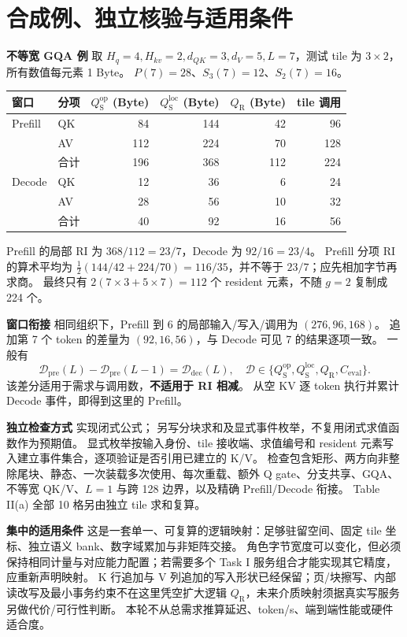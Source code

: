\documentclass[11pt,a4paper,fontset=fandol]{ctexart}
\newcommand{\op}{\mathrm{op}}
\newcommand{\loc}{\mathrm{loc}}
\newcommand{\qs}{Q_{\mathrm S}}
\newcommand{\qr}{Q_{\mathrm R}}
\newcommand{\para}[1]{\par\smallskip\noindent\textbf{#1}\quad}
\begin{document}
\clearpage
\section{合成例、独立核验与适用条件}
\para{不等宽 GQA 例}
取 $H_q=4,H_{kv}=2,d_{QK}=3,d_V=5,L=7$，测试 tile 为 $3\times2$，所有数值每元素 1 Byte。
$P(7)=28$、$S_3(7)=12$、$S_2(7)=16$。
\begin{center}\small
\begin{tabular}{@{}llrrrr@{}}\toprule
窗口 & 分项 & $\qs^\op$ (Byte) & $\qs^\loc$ (Byte) & $\qr$ (Byte) & tile 调用\\\midrule
Prefill & QK & 84 & 144 & 42 & 96\\
 & AV & 112 & 224 & 70 & 128\\
 & 合计 & 196 & 368 & 112 & 224\\\midrule
Decode & QK & 12 & 36 & 6 & 24\\
 & AV & 28 & 56 & 10 & 32\\
 & 合计 & 40 & 92 & 16 & 56\\\bottomrule
\end{tabular}\end{center}
Prefill 的局部 RI 为 $368/112=23/7$，Decode 为 $92/16=23/4$。
Prefill 分项 RI 的算术平均为 $\tfrac12(144/42+224/70)=116/35$，并不等于 $23/7$；应先相加字节再求商。
最终只有 $2(7\times3+5\times7)=112$ 个 resident 元素，不随 $g=2$ 复制成 224 个。

\para{窗口衔接}
相同组织下，Prefill 到 6 的局部输入/写入/调用为 $(276,96,168)$。
追加第 7 个 token 的差量为 $(92,16,56)$，与 Decode 可见 7 的结果逐项一致。
一般有
\begin{equation}
\mathcal D_{\mathrm{pre}}(L)-\mathcal D_{\mathrm{pre}}(L-1)
=\mathcal D_{\mathrm{dec}}(L),\quad
\mathcal D\in\{\qs^\op,\qs^\loc,\qr,C_{\mathrm{eval}}\}.
\end{equation}
该差分适用于需求与调用数，\textbf{不适用于 RI 相减}。
从空 KV 逐 token 执行并累计 Decode 事件，即得到这里的 Prefill。

\para{独立检查方式}
 实现闭式公式；
 另写分块求和及显式事件枚举，不复用闭式求值函数作为预期值。
显式枚举按输入身份、tile 接收端、求值编号和 resident 元素写入建立事件集合，逐项验证是否引用已建立的 K/V。
检查包含矩形、两方向非整除尾块、静态、一次装载多次使用、每次重载、额外 Q gate、分支共享、GQA、不等宽 QK/V、$L=1$ 与跨 128 边界，以及精确 Prefill/Decode 衔接。
Table II(a) 全部 10 格另由独立 tile 求和复算。

\para{集中的适用条件}
这是一套单一、可复算的逻辑映射：足够驻留空间、固定 tile 坐标、独立语义 bank、数字域累加与非矩阵交接。
角色字节宽度可以变化，但必须保持相同计量与对应能力配置；若需要多个 Task I 服务组合才能实现其它精度，应重新声明映射。
K 行追加与 V 列追加的写入形状已经保留；页/块擦写、内部读改写及最小事务约束不在这里凭空扩大逻辑 $\qr$，未来介质映射须据真实写服务另做代价/可行性判断。
本轮不从总需求推算延迟、token/s、端到端性能或硬件适合度。
\end{document}
